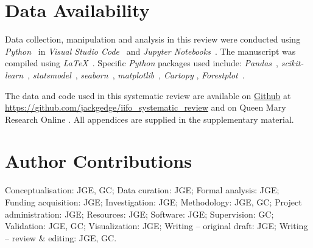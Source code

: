 \documentclass[pdflatex,sn-basic,Numbered]{sn-jnl}
\begin{document}
\section*{Data Availability}
\noindent Data collection, manipulation and analysis in this review were conducted using \textit{Python}~\cite{PythonSoftwareFoundation_2025} in \textit{Visual Studio Code}~\cite{Microsoft_2025} and \textit{Jupyter Notebooks}~\cite{Kluyver_2016}. The manuscript was compiled using \textit{LaTeX}~\cite{Lamport_1984}. Specific \textit{Python} packages used include: \textit{Pandas}~\cite{ThePandasDevelopmentTeam_2020}, \textit{scikit-learn}~\cite{Pedregosa_2011}, \textit{statsmodel}~\cite{Seabold_2010}, \textit{seaborn}~\cite{Waskom_2021}, \textit{matplotlib}~\cite{Hunter_2007a}, \textit{Cartopy} \cite{MetOffice_2010}, \textit{Forestplot}~\cite{Shen_2022}.

The data and code used in this systematic review are available on \href{https://github.com/jackgedge/iifo\_systematic\_review}{Github} at \url{https://github.com/jackgedge/iifo\_systematic\_review} and on Queen Mary Research Online \cite{Galbraith-Edge_2025}. All appendices are supplied in the supplementary material.

\section*{Author Contributions}
Conceptualisation: JGE, GC; Data curation: JGE; Formal analysis: JGE; Funding acquisition: JGE; Investigation: JGE; Methodology: JGE, GC; Project administration: JGE; Resources: JGE; Software: JGE; Supervision: GC; Validation: JGE, GC; Visualization: JGE; Writing – original draft: JGE; Writing – review \& editing: JGE, GC.

\clearpage


\clearpage

\end{document}
